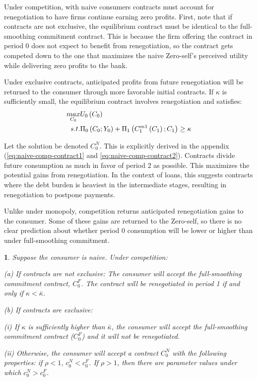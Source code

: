 \documentclass[11pt,english]{article}
\theoremstyle{plain}
\newtheorem{prop}{\protect\propositionname}
\theoremstyle{definition}
\providecommand{\propositionname}{Proposition}
\begin{document}
Under competition, with naive consumers contracts must account for
renegotiation to have firms continue earning zero profits. First,
note that if contracts are not exclusive, the equilibrium contract
must be identical to the full-smoothing commitment contract. This
is because the firm offering the contract in period 0 does not expect
to benefit from renegotiation, so the contract gets competed down
to the one that maximizes the naive Zero-self's perceived utility
while delivering zero profits to the bank.

Under exclusive contracts, anticipated profits from future renegotiation
will be returned to the consumer through more favorable initial contracts.
If $\kappa$ is sufficiently small, the equilibrium contract involves
renegotiation and satisfies: 
\begin{align}
\underset{C_{0}}{\mbox{\ensuremath{max}}} & U_{0}\left(C_{0}\right)\nonumber \\
s.t. & \Pi_{0}\left(C_{0};Y_{0}\right)+\Pi_{1}\left(C_{1}^{m1}\left(C_{1}\right);C_{1}\right)\geq\kappa
\end{align}

Let the solution be denoted $C_{0}^{N}$. This is explicitly derived
in the appendix (\ref{eq:naive-comp-contract1} and \ref{eq:naive-comp-contract2}).
Contracts divide future consumption as much in favor of period 2 as
possible. This maximizes the potential gains from renegotiation. In the context
of loans, this suggests contracts where the debt burden is heaviest
in the intermediate stages, resulting in renegotiation to postpone
payments.

Unlike under monopoly, competition returns anticipated renegotiation gains to the consumer. Some of these gains are returned to the
Zero-self, so there is no clear prediction about whether period 0
consumption will be lower or higher than under full-smoothing commitment.
\begin{prop}
Suppose the consumer is naive. Under competition:

(a) If contracts are not exclusive: The consumer will accept the full-smoothing
commitment contract, $C_{0}^{F}$. The contract will be renegotiated
in period 1 if and only if $\kappa<\bar{\kappa}$.

(b) If contracts are exclusive: 

(i) If $\kappa$ is sufficiently higher than $\bar{\kappa}$, the
consumer will accept the full-smoothing commitment contract ($C_{0}^{F}$)
and it will not be renegotiated. 

(ii) Otherwise, the consumer will accept a contract $C_{0}^{N}$ with
the following properties: if $\rho<1$, $c_{0}^{N}<c_{0}^{F}$. If
$\rho>1$, then there are parameter values under which $c_{0}^{N}>c_{0}^{F}$. 
\end{prop}
\end{document}
